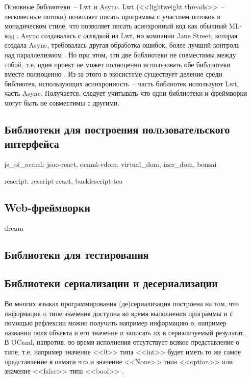 Основные библиотеки~-- Lwt и Async. Lwt (<<lightweight threads>>~-- легковесные потоки)
позволяет писать программы с участием потоков в монадическом стиле, что позволяет писать
асинхронный код как обычный ML-код \cite{vouillon-lwt}. Async создавалась с оглядкой на Lwt,
но компании Jane Street, которая создала Async, требовалась другая обработка ошибок,
более лучший контроль над параллелизмом \cite{announcing-async}. Но при этом, эти две библиотеки
не совместимы между собой, т.е. один проект не может полноценно использовать обе библиотеки
вместе полноценно \cite{rgrinberg-async}. Из-за этого в экосистеме существует деление среди библиотек,
использующих асинхронность~-- часть библиотек используют Lwt, часть Async. Получается, следует
учитывать что одни библиотеки и фреймворки могут быть не совместимы с другими.

\TODO

\subsection{Библиотеки для построения пользовательского интерфейса}

\TODO

js\_of\_ocaml: jsoo-react, ocaml-vdom, virtual\_dom, incr\_dom, bonsai

rescript: rescript-react, bucklescript-tea

\subsection{Web-фреймворки}

dream \TODO

\subsection{Библиотеки для тестирования}

\TODO

\subsection{Библиотеки сериализации и десериализации}

Во многих языках программирования (де)сериализация построена на том, что
информация о типе значения доступна во время выполнения программы и с помощью рефлексии можно
получить например информацию о, например названии поля объекта и его значение и записать их в
сериализуемый результат. В OCaml, напротив, во время исполнения отсутствует всякое представление
о типе, т.е. например значение <<0>> типа <<int>> будет иметь то же самое представление в памяти что и
значение <<None>> типа <<option>> или значение <<false>> типа <<bool>> \cite{rwo-runtime-memory}.

